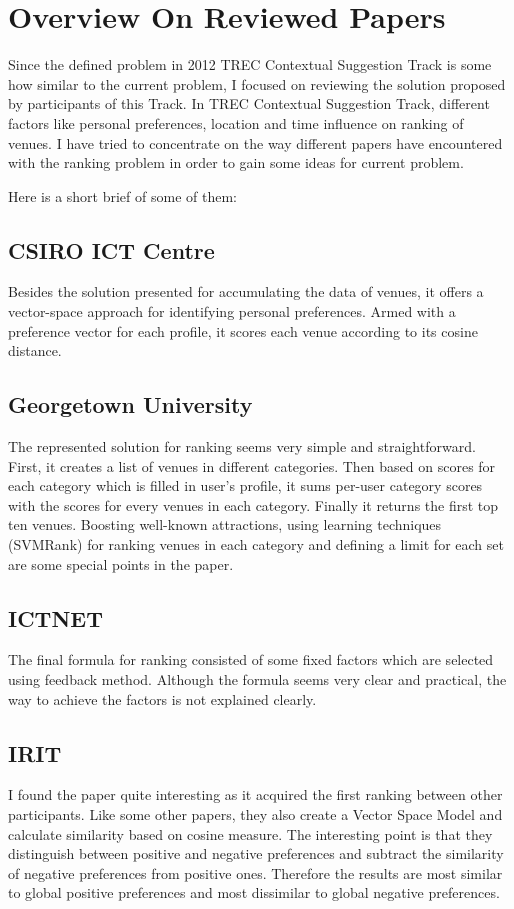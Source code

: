 
\section{Overview On Reviewed Papers}
Since the defined problem in 2012 TREC Contextual Suggestion Track is some how similar to the current problem, I focused on reviewing the solution proposed by participants of this Track. In TREC Contextual Suggestion Track, different factors like personal preferences, location and time influence on ranking of venues. I have tried to concentrate on the way different papers have encountered with the ranking problem in order to gain some ideas for current problem.

Here is a short brief of some of them:

\subsection{CSIRO ICT Centre \cite{CSIRO}} 
Besides the solution presented for accumulating the data of venues, it offers a vector-space approach for identifying personal preferences. Armed with a preference vector for each profile, it scores each venue according to its cosine distance.

\subsection{Georgetown University \cite{GeorgetownUniversity}}
The represented solution for ranking seems very simple and straightforward. First, it creates a list of venues in different categories. Then based on scores for each category which is filled in user's profile, it sums per-user category scores with the scores for every venues in each category. Finally it returns the first top ten venues. Boosting well-known attractions, using learning techniques (SVMRank) for ranking venues in each category and defining a limit for each set are some special points in the paper.

\subsection{ICTNET \cite{ICTNET}}
The final formula for ranking consisted of some fixed factors which are selected using feedback method. Although the formula seems very clear and practical, the way to achieve the factors is not explained clearly.

\subsection{IRIT \cite{IRIT}}
I found the paper quite interesting as it acquired the first ranking between other participants. Like some other papers, they also create a Vector Space Model and calculate similarity based on cosine measure. The interesting point is that they distinguish between positive and negative preferences and subtract the similarity of negative preferences from positive ones. Therefore the results are most similar to global positive preferences and most dissimilar to global negative preferences.

